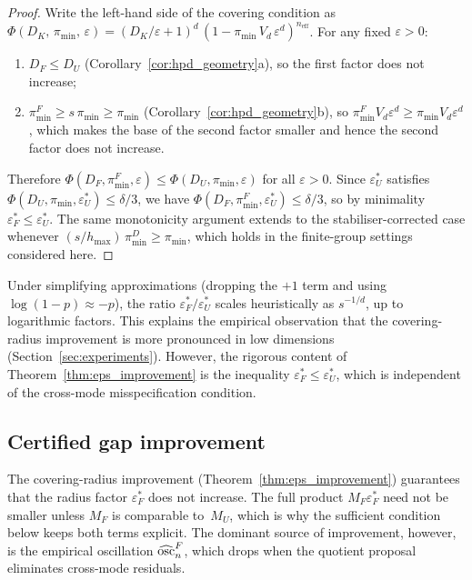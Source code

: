 \begin{proof}
  Write the left-hand side of the covering condition as
  $\Phi(D_K,\, \pi_{\min},\, \varepsilon)
  = (D_K/\varepsilon + 1)^d\,
  (1 - \pi_{\min}\, V_d\, \varepsilon^d)^{n_{\mathrm{eff}}}$.
  For any fixed $\varepsilon > 0$:
  \begin{enumerate}[nosep]
    \item $D_F \leq D_U$
    (Corollary~\ref{cor:hpd_geometry}a), so the first factor does not
    increase;
    \item $\pi_{\min}^F \geq s\,\pi_{\min} \geq \pi_{\min}$
    (Corollary~\ref{cor:hpd_geometry}b), so
    $\pi_{\min}^F V_d \varepsilon^d \geq \pi_{\min} V_d \varepsilon^d$,
    which makes the base of the second factor smaller and hence the
    second factor does not increase.
  \end{enumerate}
  Therefore $\Phi(D_F, \pi_{\min}^F, \varepsilon)
  \leq \Phi(D_U, \pi_{\min}, \varepsilon)$ for all
  $\varepsilon > 0$.
  Since $\varepsilon_U^*$ satisfies
  $\Phi(D_U, \pi_{\min}, \varepsilon_U^*) \leq \delta/3$, we have
  $\Phi(D_F, \pi_{\min}^F, \varepsilon_U^*) \leq \delta/3$, so by
  minimality $\varepsilon_F^* \leq \varepsilon_U^*$.
  The same monotonicity argument extends to the stabiliser-corrected
  case whenever $(s/h_{\max})\,\pi_{\min}^D \geq \pi_{\min}$, which
  holds in the finite-group settings considered here.
\end{proof}

\begin{remark}\label{rem:eps_scaling}
  Under simplifying approximations (dropping the $+1$ term and using
  $\log(1 - p) \approx -p$), the ratio
  $\varepsilon_F^* / \varepsilon_U^*$ scales heuristically as
  $s^{-1/d}$, up to logarithmic factors.  This explains the
  empirical observation that the covering-radius improvement is
  more pronounced in low dimensions
  (Section~\ref{sec:experiments}).  However, the rigorous content
  of Theorem~\ref{thm:eps_improvement} is the inequality
  $\varepsilon_F^* \leq \varepsilon_U^*$, which is independent of
  the cross-mode misspecification condition.
\end{remark}


\subsection{Certified gap improvement}
\label{sec:gap_improvement}

The covering-radius improvement (Theorem~\ref{thm:eps_improvement})
guarantees that the radius factor $\varepsilon_F^*$ does not
increase.  The full product $M_F\varepsilon_F^*$ need not be
smaller unless $M_F$ is comparable to~$M_U$, which is why the
sufficient condition below keeps both terms explicit.
The dominant source of improvement, however, is the empirical
oscillation $\widehat{\mathrm{osc}}_n^F$, which drops when the quotient
proposal eliminates cross-mode residuals.

